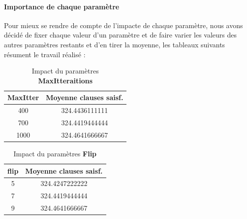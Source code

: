 	\paragraph{Importance de chaque paramètre}
	Pour mieux se rendre de compte de l'impacte de chaque paramètre, nous avons décidé de fixer chaque valeur d'un paramètre et de faire varier les valeurs des autres paramètres restants et d'en tirer la moyenne, les tableaux suivants résument le travail réalisé :
	
	\begin{table}[H]
		\centering
		\begin{tabular}{|c|c|}
			\hline
			\textbf{MaxItter}                    & \textbf{Moyenne clauses saisf}.                \\ \hline
			400                         & 324.4436111111                        \\ \hline
			700                         & 324.4419444444                        \\ \hline
			\rowcolor[HTML]{67FD9A} 
			{\color[HTML]{333333} 1000} & {\color[HTML]{333333} 324.4641666667} \\ \hline
		\end{tabular}
		\caption{Impact du paramètres \textbf{MaxItteraitions}}
		\label{average1}
	\end{table}
	\begin{table}[H]
		\centering
		\begin{tabular}{|c|c|}
			\hline
			\textbf{flip} & \textbf{Moyenne clauses saisf.} \\ \hline
			\rowcolor[HTML]{67FD9A} 
			5    & 324.4247222222         \\ \hline
			7    & 324.4419444444         \\ \hline
			9    & 324.4641666667         \\ \hline
		\end{tabular}
		\caption{Impact du paramètres \textbf{Flip}}
		\label{average2}
	\end{table}
	
